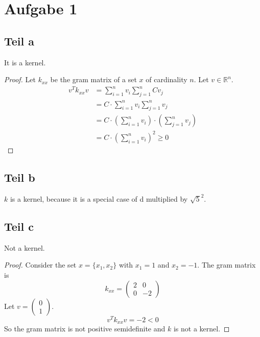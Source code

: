 \documentclass[10pt,a4paper]{article}
\begin{document}
\section{Aufgabe 1}

\subsection{Teil a}

It is a kernel.

\begin{proof}
  Let $k_{xx}$ be the gram matrix of a set $x$ of cardinality $n$. Let
  $v \in \mathbb{R}^n$.
  \begin{align*}
    v^T k_{xx} v & = \sum_{i = 1}^n v_i \sum_{j = 1}^n C v_j\\
                 & = C \cdot \sum_{i = 1}^n v_i \sum_{j = 1}^n v_j\\
                 & = C \cdot \left( \sum_{i = 1}^n v_i \right) \cdot \left( \sum_{j = 1}^n v_j \right)\\
                 & = C \cdot \left( \sum_{i = 1}^n v_i \right)^2 \ge 0
  \end{align*}
\end{proof}

\subsection{Teil b}

$k$ is a kernel, because it is a special case of d multiplied by $\sqrt{5}^2$.

\subsection{Teil c}

Not a kernel.

\begin{proof}
  Consider the set $x = \{ x_1, x_2 \}$ with $x_1 = 1$ and $x_2 = -1$. The gram
  matrix is
  \begin{equation}
    k_{xx} = \begin{pmatrix}
      2 & 0\\
      0 & -2
    \end{pmatrix}
  \end{equation}
  Let $v = \begin{pmatrix}0\\1\end{pmatrix}$.
  \begin{equation}
    v^T k_{xx} v = -2 < 0
  \end{equation}
  So the gram matrix is not positive semidefinite and $k$ is not a kernel.
\end{proof}
\end{document}
